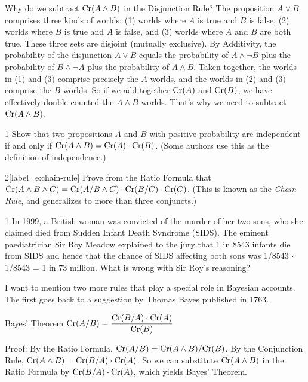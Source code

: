 Why do we subtract $\text{Cr}(A \land B)$ in the Disjunction Rule? The proposition
$A\lor B$ comprises three kinds of worlds: (1) worlds where $A$ is true and $B$
is false, (2) worlds where $B$ is true and $A$ is false, and (3) worlds where
$A$ and $B$ are both true. These three sets are disjoint (mutually exclusive).
By Additivity, the probability of the disjunction $A \lor B$ equals the
probability of $A \land \neg B$ plus the probability of $B \land \neg A$ plus
the probability of $A \land B$. Taken together, the worlds in (1) and (3)
comprise precisely the $A$-worlds, and the worlds in (2) and (3) comprise the
$B$-worlds. So if we add together $\text{Cr}(A)$ and $\text{Cr}(B)$, we have effectively
double-counted the $A \land B$ worlds. That's why we need to subtract
$\text{Cr}(A \land B)$.

\begin{exercise}{1}
  Show that two propositions $A$ and $B$ with positive probability are independent
  if and only if $\text{Cr}(A \land B) = \text{Cr}(A) \cdot \text{Cr}(B)$. (Some authors use this as
  the definition of independence.)
\end{exercise}

\begin{exercise}{2}[label=e:chain-rule]
  Prove from the Ratio Formula that $\text{Cr}(A \land B \land C) = \text{Cr}(A/B
  \land C) \cdot \text{Cr}(B/C) \cdot \text{Cr}(C)$. (This is known as the \emph{Chain Rule}, and generalizes to more than three conjuncts.)
  \vspace{-2mm}
\end{exercise}

\begin{exercise}{1}
  In 1999, a British woman was convicted of the murder of her two
  sons, who she claimed died from Sudden Infant Death Syndrome
  (SIDS). The eminent paediatrician Sir Roy Meadow explained to the
  jury that 1 in 8543 infants die from SIDS and hence that the chance of
  SIDS affecting both sons was 1/8543 $\cdot$ 1/8543 = 1 in 73
  million. What is wrong with Sir Roy's reasoning?
\end{exercise}

I want to mention two more rules that play a special role in Bayesian accounts.
The first goes back to a suggestion by Thomas Bayes published in 1763.
%
\begin{genericthm}{Bayes' Theorem}
  \quad\newline
  $\text{Cr}(A/B) = \dfrac{\text{Cr}(B/A) \cdot \text{Cr}(A)}{\text{Cr}(B)}$
\end{genericthm}
%
\noindent%
Proof: By the Ratio Formula, $\text{Cr}(A/B) = \text{Cr}(A \land B) / \text{Cr}(B)$. By
the Conjunction Rule, $\text{Cr}(A \land B) = \text{Cr}(B/A) \cdot \text{Cr}(A)$. So we
can substitute $\text{Cr}(A \land B)$ in the Ratio Formula by
$\text{Cr}(B/A)\cdot \text{Cr}(A)$, which yields Bayes' Theorem.

